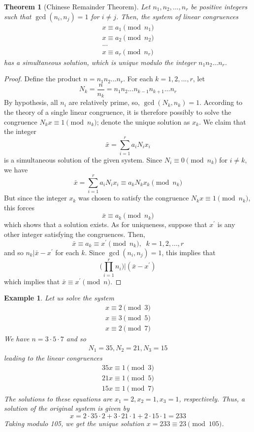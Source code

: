 \documentclass{article}
\newtheorem{theorem}{Theorem}[section]
\newtheorem{example}{Example}[section]
\theoremstyle{remark}
\theoremstyle{definition}
\begin{document}
\begin{theorem}[Chinese Remainder Theorem]
Let $n_1, n_2, ..., n_r$ be positive integers such that $\gcd(n_i, n_j) = 1$ for $i \neq j$. Then, the system of linear congruences 
\begin{align*}
    x \equiv a_1 \pmod{n_1} \\
    x \equiv a_2 \pmod{n_2} \\
    ... \\
    x \equiv a_r \pmod{n_r}
\end{align*}
has a simultaneous solution, which is unique modulo the integer $n_1 n_2 ... n_r$. 
\end{theorem}
\begin{proof}
Define the product $n = n_1 n_2 ... n_r$. For each $k = 1, 2, ..., r$, let
\[N_k = \frac{n}{n_k} = n_1 n_2 ... n_{k-1} n_{k+1} ... n_r\]
By hypothesis, all $n_i$ are relatively prime, so, $\gcd(N_k, n_k) = 1$. According to the theory of a single linear congruence, it is therefore possibly to solve the congruence $N_k x \equiv 1 \pmod{n_k}$; denote the unique solution as $x_k$. We claim that the integer 
\[\bar{x} = \sum_{i = 1}^r a_i N_i x_i\]
is a simultaneous solution of the given system. Since $N_i \equiv 0 \pmod{n_k}$ for $i \neq k$, we have
\[\bar{x} = \sum_{i=1}^r a_i N_i x_i \equiv a_k N_k x_k \pmod{n_k}\]
But since the integer $x_k$ was chosen to satisfy the congruence $N_k x \equiv 1 \pmod{n_k}$, this forces
\[\bar{x} \equiv a_k \pmod{n_k}\]
which shows that a solution exists. As for uniqueness, suppose that $x^\prime$ is any other integer satisfying the congruences. Then, 
\[\bar{x} \equiv a_k \equiv x^\prime \pmod{n_k}, \;\; k = 1, 2, ..., r\]
and so $n_k | \bar{x} - x^\prime$ for each $k$. Since $\gcd(n_i, n_j) = 1$, this implies that 
\[\Big( \prod_{i=1}^r n_i \Big) \bigg| (\bar{x} - x^\prime)\]
which implies that $\bar{x} \equiv x^\prime \pmod{n}$. 
\end{proof}

\begin{example}
Let us solve the system 
\begin{align*}
    x \equiv 2 \pmod{3} \\
    x \equiv 3 \pmod{5} \\
    x \equiv 2 \pmod{7}
\end{align*}
We have $n = 3 \cdot 5 \cdot 7$ and so
\begin{align*}
    N_1 = 35, N_2 = 21, N_3 = 15
\end{align*}
leading to the linear congruences
\begin{align*}
    35x \equiv 1 \pmod{3} \\
    21 x \equiv 1 \pmod{5} \\
    15 x \equiv 1 \pmod{7}
\end{align*}
The solutions to these equations are $x_1 = 2, x_2 = 1, x_3 = 1$, respectively. Thus, a solution of the original system is given by 
\[x = 2 \cdot 35 \cdot 2 + 3 \cdot 21 \cdot 1 + 2 \cdot 15 \cdot 1 = 233\]
Taking modulo 105, we get the unique solution $x = 233 \equiv 23 \pmod{105}$. 
\end{example}
\end{document}
